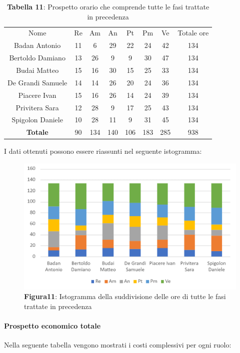 \begin{table}[H]
	\centering
	\renewcommand{\arraystretch}{1.5}
	\begin{tabular}{|c|c|c|c|c|c|c|c|}
		\hline
		\rowcolor{lighter-grayer}
		Nome & Re & Am & An & Pt & Pm & Ve & Totale ore\\
Badan Antonio     & 11 & 6   & 29  & 22  & 24  & 42  & 134 \\ \hline
Bertoldo Damiano  & 13 & 26  & 9   & 9   & 30  & 47  & 134 \\ \hline
Budai Matteo      & 15 & 16  & 30  & 15  & 25  & 33  & 134 \\ \hline
De Grandi Samuele & 14 & 14  & 26  & 20  & 24  & 36  & 134 \\ \hline
Piacere Ivan      & 15 & 16  & 26  & 14  & 24  & 39  & 134 \\ \hline
Privitera Sara    & 12 & 28  & 9   & 17  & 25  & 43  & 134 \\ \hline
Spigolon Daniele  & 10 & 28  & 11  & 9   & 31  & 45  & 134 \\ \hline
\textbf{Totale}   & 90 & 134 & 140 & 106 & 183 & 285 & 938 \\ \hline
	\end{tabular}
	\caption*{\textbf{Tabella 11}: Prospetto orario che comprende tutte le fasi trattate in precedenza\\}
\end{table}	
I dati ottenuti possono essere riassunti nel seguente istogramma:

\begin{figure}[H]
	\centering
	\includegraphics[width=0.7\linewidth]{res/images/IstogrammaTotale.png}
	\caption*{\textbf{Figura11}: Istogramma della suddivisione delle ore di tutte le fasi trattate in precedenza}
	\label{fig:Figura10}
\end{figure}

\paragraph{Prospetto economico totale}
Nella seguente tabella vengono mostrati i costi complessivi per ogni ruolo:

